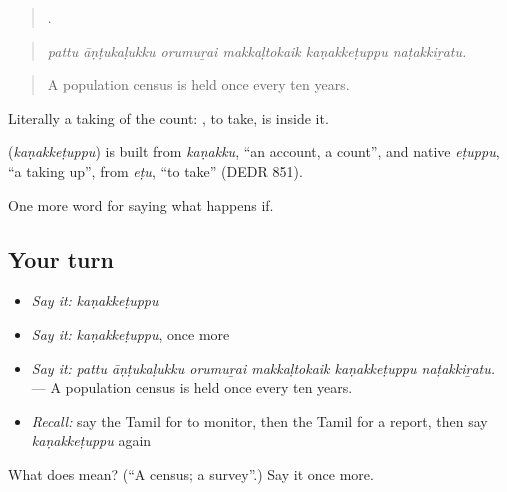 \begin{quote}
     .
\end{quote}

\begin{quote}
\emph{pattu āṇṭukaḷukku orumuṟai makkaḷtokaik kaṇakkeṭuppu naṭakkiṟatu.}
\end{quote}

\begin{quote}
A population census is held once every ten years.
\end{quote}

Literally a taking of the count: , to take, is inside it.

\begin{cousinweb}
\textbf{} (\emph{kaṇakkeṭuppu}) is built from \emph{kaṇakku}, \textquotedblleft{}an account, a count\textquotedblright{}, and native \emph{eṭuppu}, \textquotedblleft{}a taking up\textquotedblright{}, from \emph{eṭu}, \textquotedblleft{}to take\textquotedblright{} (DEDR 851).
\end{cousinweb}

\begin{grammarlens}[title={What you've built}]
One more word for saying what happens if.
\end{grammarlens}

\subsection*{Your turn}
\begin{itemize}
\raggedright
  \item \emph{Say it:} \emph{kaṇakkeṭuppu}
  \item \emph{Say it:} \emph{kaṇakkeṭuppu}, once more
  \item \emph{Say it:} \emph{pattu āṇṭukaḷukku orumuṟai makkaḷtokaik kaṇakkeṭuppu naṭakkiṟatu.} — A population census is held once every ten years.
  \item \emph{Recall:} say the Tamil for to monitor, then the Tamil for a report, then say \emph{kaṇakkeṭuppu} again
\end{itemize}

\begin{tcolorbox}[breakable,colback=teal!4,colframe=teal!35!black,title={Before you move on}]
What does  mean? (\textquotedblleft{}A census; a survey\textquotedblright{}.) Say it once more.
\end{tcolorbox}
